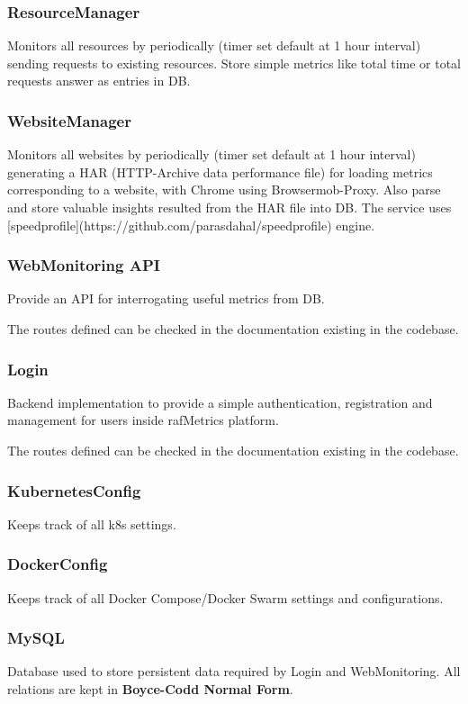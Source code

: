 \subsubsection{ResourceManager}
Monitors all resources by periodically (timer set default at 1 hour interval) sending requests to existing resources.
Store simple metrics like total time or total requests answer as entries in DB.

\subsubsection{WebsiteManager}
Monitors all websites by periodically (timer set default at 1 hour interval) generating a HAR (HTTP-Archive data performance file) for loading metrics corresponding to a website, with Chrome using Browsermob-Proxy.
Also parse and store valuable insights resulted from the HAR file into DB.
The service uses [speedprofile](https://github.com/parasdahal/speedprofile) engine.

\subsubsection{WebMonitoring API}
Provide an API for interrogating useful metrics from DB.

The routes defined can be checked in the documentation existing in the codebase.

\subsubsection{Login}
Backend implementation to provide a simple authentication, registration and management for users inside rafMetrics platform.

The routes defined can be checked in the documentation existing in the codebase.

\subsubsection{KubernetesConfig}
Keeps track of all k8s settings.

\subsubsection{DockerConfig}
Keeps track of all Docker Compose/Docker Swarm settings and configurations.

\subsubsection{MySQL}
Database used to store persistent data required by Login and WebMonitoring.
All relations are kept in \textbf{Boyce-Codd Normal Form}.

